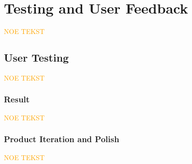 \chapter{Testing and User Feedback}

\textcolor{orange}{NOE TEKST}

\section{User Testing}

\textcolor{orange}{NOE TEKST}

\subsection{Result}

\textcolor{orange}{NOE TEKST}

\subsection{Product Iteration and Polish}

\textcolor{orange}{NOE TEKST}
